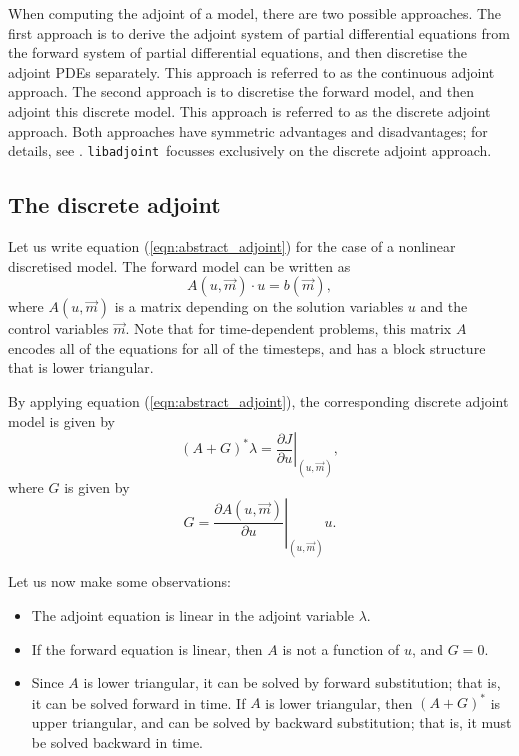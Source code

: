\documentclass[10pt,authoryear]{elsarticle}
\newcommand{\m}[0]{{\vec{m}}}
\newcommand{\libadjoint}[0]{{\texttt{libadjoint}}}
\begin{document}
When computing the adjoint of a model, there are two possible approaches. The first approach is to derive the adjoint
system of partial differential equations from the forward system of partial differential equations, and then discretise
the adjoint PDEs separately. This approach is referred to as the continuous adjoint approach. The second approach is to discretise
the forward model, and then adjoint this discrete model. This approach is referred to as the discrete adjoint approach.
Both approaches have symmetric advantages and disadvantages; for details, see \citet{gunzburger2003}. \libadjoint\ focusses exclusively
on the discrete adjoint approach.

\subsection{The discrete adjoint}
Let us write equation (\ref{eqn:abstract_adjoint}) for the case of a nonlinear discretised model.
The forward model can be written as
\begin{equation}
A(u,\m)\cdot u = b(\m),
\end{equation}
where $A(u,\m)$ is a matrix depending on the solution variables $u$ and the control variables $\m$. Note that for time-dependent problems,
this matrix $A$ encodes all of the equations for all of the timesteps, and has a block structure that is
lower triangular. 

By applying equation (\ref{eqn:abstract_adjoint}), the corresponding discrete adjoint model is given by
\begin{equation} \label{eqn:discrete_adjoint}
\left(A + G\right)^{*}\lambda = \left.\frac{\partial J}{\partial u}\right|_{(u,\m)},
\end{equation}
where $G$ is given by
\begin{equation}
G = \left.\frac{\partial A(u,\m)}{\partial u}\right|_{(u,\m)} u.
\end{equation}

Let us now make some observations:
\begin{itemize}
\item The adjoint equation is linear in the adjoint variable $\lambda$.
\item If the forward equation is linear, then $A$ is not a function of $u$, and $G = 0$.
\item Since $A$ is lower triangular, it can be solved by forward substitution; that is, it can be
solved forward in time. If $A$ is lower triangular, then $(A+G)^{*}$ is upper triangular, and can be solved
by backward substitution; that is, it must be solved backward in time.
\end{itemize}
\end{document}
